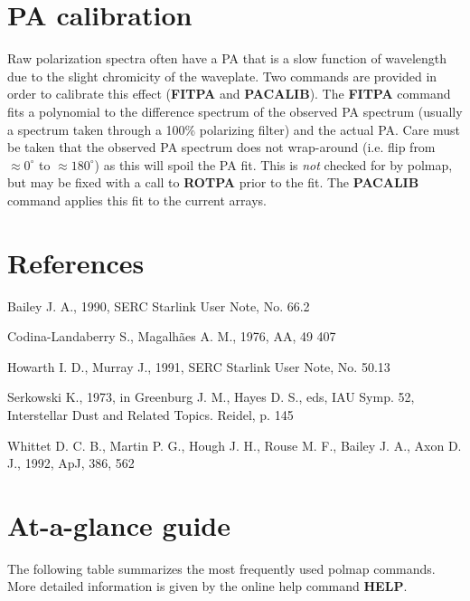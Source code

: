 \section{PA calibration}

Raw polarization spectra often have a PA that is a slow function of
wavelength due to the slight chromicity of the waveplate. Two commands
are provided in order to calibrate this effect ({\bf FITPA} and {\bf
PACALIB}). The {\bf FITPA} command fits a polynomial to the difference
spectrum of the observed PA spectrum (usually a spectrum taken through
a 100\% polarizing filter) and the actual PA.  Care must be taken
that the observed PA spectrum does not wrap-around (i.e. flip from
$\approx0^\circ$ to $\approx180^\circ$) as this will spoil the PA
fit. This is {\em not} checked for by {\sc polmap}, but may be fixed with a
call to {\bf ROTPA} prior to the fit. The {\bf PACALIB}
command applies this fit to the current arrays.

\section{References} 

Bailey J. A., 1990, SERC Starlink User Note, No. 66.2

Codina-Landaberry S., Magalh\~{a}es A. M., 1976, AA, 49 407

Howarth I. D., Murray J., 1991, SERC Starlink User Note, No. 50.13

Serkowski K., 1973, in Greenburg J. M., Hayes D. S., eds, IAU Symp. 52,
Interstellar Dust and Related Topics. Reidel, p. 145

Whittet D. C. B., Martin P. G., Hough J. H., Rouse M. F., Bailey J. A.,
Axon D. J., 1992, ApJ, 386, 562

\appendix
\newpage
\section{At-a-glance guide}

The following table summarizes the most frequently used {\sc polmap}
commands. More detailed information is given by the online help
command {\bf HELP}.

